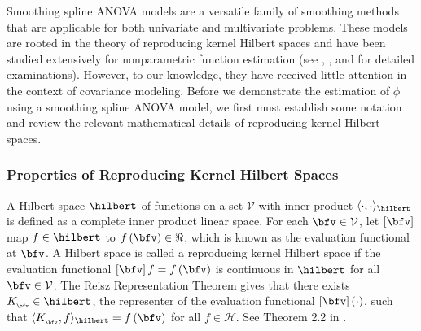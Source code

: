 
%
Smoothing spline ANOVA models \citep{gu2002smoothing} are a versatile family of smoothing methods that are applicable for both univariate and multivariate problems. These models are rooted in the theory of reproducing kernel Hilbert spaces and have been studied extensively for nonparametric function estimation (see \cite{aronszajn1950theory}, \cite{wahba1990spline}, and \cite{berlinet2011reproducing} for detailed examinations).  However, to our knowledge, they have received little attention in the context of covariance modeling. Before we demonstrate the estimation of $\phi$ using a smoothing spline ANOVA model, we first must establish some notation and review the relevant mathematical details of reproducing kernel Hilbert spaces. 


\subsubsection{Properties of Reproducing Kernel Hilbert Spaces}

A Hilbert space $\hilbert$ of functions on a set $\mathcal{V}$ with inner product $\langle \cdot, \cdot\rangle_\hilbert$ is defined as a complete inner product linear space. For each $\bfv \in \mathcal{V}$, let $\left[\bfv \right]$ map $f \in \hilbert$ to $f\left(\bfv\right) \in \Re$, which is known as the evaluation functional at $\bfv$. A Hilbert space is called a reproducing kernel Hilbert space if the evaluation functional $\left[\bfv\right]f = f\left(\bfv\right)$ is continuous in $\hilbert$ for all $\bfv \in \mathcal{V}$. The Reisz Representation Theorem gives that there exists $K_{_\bfv} \in \hilbert$, the representer of the evaluation functional $\left[\bfv\right]\left(\cdot\right)$, such that $\langle K_{_\bfv}, f \rangle_\hilbert = f\left(\bfv\right)$ for all $f \in \mathcal{H}$. See Theorem 2.2 in \cite{gu2013smoothing}.

